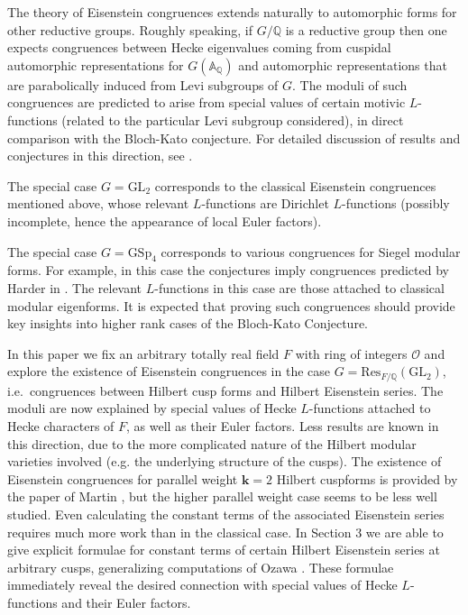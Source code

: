 \documentclass[a4paper,oneside]{amsart}
\theoremstyle{plain}
\theoremstyle{definition}
\begin{document}
The theory of Eisenstein congruences extends naturally to automorphic forms for other reductive groups. Roughly speaking, if $G/\mathbb{Q}$ is a reductive group then one expects congruences between Hecke eigenvalues coming from cuspidal automorphic representations for $G(\mathbb{A}_{\mathbb{Q}})$ and automorphic representations that are parabolically induced from Levi subgroups of $G$. The moduli of such congruences are predicted to arise from special values of certain motivic $L$-functions (related to the particular Levi subgroup considered), in direct comparison with the Bloch-Kato conjecture. For detailed discussion of results and conjectures in this direction, see \cite{bergstromdummigan}. 

The special case $G = \text{GL}_2$ corresponds to the classical Eisenstein congruences mentioned above, whose relevant $L$-functions are Dirichlet $L$-functions (possibly incomplete, hence the appearance of local Euler factors). 

The special case $G = \text{GSp}_4$ corresponds to various congruences for Siegel modular forms. For example, in this case the conjectures imply congruences predicted by Harder in \cite{harder}. The relevant $L$-functions in this case are those attached to classical modular eigenforms. It is expected that proving such congruences should provide key insights into higher rank cases of the Bloch-Kato Conjecture.

In this paper we fix an arbitrary totally real field $F$ with ring of integers $\mathcal{O}$ and explore the existence of Eisenstein congruences in the case $G = \text{Res}_{F/\mathbb{Q}}(\text{GL}_2)$, i.e.\ congruences between Hilbert cusp forms and Hilbert Eisenstein series. The moduli are now explained by special values of Hecke $L$-functions attached to Hecke characters of $F$, as well as their Euler factors. Less results are known in this direction, due to the more complicated nature of the Hilbert modular varieties involved (e.g. the underlying structure of the cusps). The existence of Eisenstein congruences for parallel weight $\textbf{k} = 2$ Hilbert cuspforms is provided by the paper of Martin \cite{martin}, but the higher parallel weight case seems to be less well studied. Even calculating the constant terms of the associated Eisenstein series requires much more work than in the classical case. In Section $3$ we are able to give explicit formulae for constant terms of certain Hilbert Eisenstein series at arbitrary cusps, generalizing computations of Ozawa \cite{ozawa}. These formulae immediately reveal the desired connection with special values of Hecke $L$-functions and their Euler factors.
\end{document}

